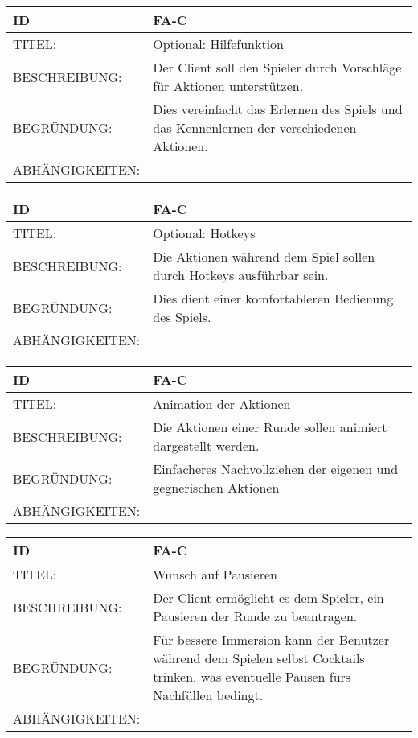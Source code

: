 \begin{tabularx}{16cm}{l|X}
\textbf{ID} & \textbf{FA-C} \\
\hline
TITEL: & Optional: Hilfefunktion \\
\hline 
BESCHREIBUNG: & Der Client soll den Spieler durch Vorschläge für Aktionen unterstützen. \\
\hline
BEGRÜNDUNG: & Dies vereinfacht das Erlernen des Spiels und das Kennenlernen der verschiedenen Aktionen. \\
\hline
ABHÄNGIGKEITEN: & \\
\end{tabularx}

\begin{tabularx}{16cm}{l|X}
\textbf{ID} & \textbf{FA-C} \\
\hline
TITEL: & Optional: Hotkeys \\
\hline 
BESCHREIBUNG: & Die Aktionen während dem Spiel sollen durch Hotkeys ausführbar sein. \\
\hline
BEGRÜNDUNG: & Dies dient einer komfortableren Bedienung des Spiels. \\
\hline
ABHÄNGIGKEITEN: & \\
\end{tabularx}

\begin{tabularx}{16cm}{l|X}
\textbf{ID} & \textbf{FA-C} \\
\hline
TITEL: & Animation der Aktionen \\
\hline 
BESCHREIBUNG: & Die Aktionen einer Runde sollen animiert dargestellt werden. \\
\hline
BEGRÜNDUNG: & Einfacheres Nachvollziehen der eigenen und gegnerischen Aktionen \\
\hline
ABHÄNGIGKEITEN: & \\
\end{tabularx}

\begin{tabularx}{16cm}{l|X}
\textbf{ID} & \textbf{FA-C} \\
\hline
TITEL: & Wunsch auf Pausieren \\
\hline 
BESCHREIBUNG: & Der Client ermöglicht es dem Spieler, ein Pausieren der Runde zu beantragen. \\
\hline
BEGRÜNDUNG: & Für bessere Immersion kann der Benutzer während dem Spielen selbst Cocktails trinken, was eventuelle Pausen fürs Nachfüllen bedingt. \\
\hline
ABHÄNGIGKEITEN: & \\
\end{tabularx}

